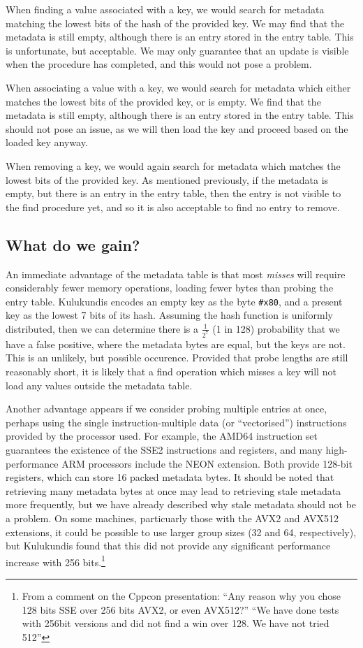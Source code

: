 \documentclass{article}
\begin{document}
When finding a value associated with a key, we would search for metadata
matching the lowest bits of the hash of the provided key. We may find
that the metadata is still empty, although there is an entry stored in
the entry table. This is unfortunate, but acceptable. We may only
guarantee that an update is visible when the procedure has completed,
and this would not pose a problem.

When associating a value with a key, we would search for metadata which
either matches the lowest bits of the provided key, or is empty. We find
that the metadata is still empty, although there is an entry stored in
the entry table. This should not pose an issue, as we will then load the
key and proceed based on the loaded key anyway.

When removing a key, we would again search for metadata which matches
the lowest bits of the provided key. As mentioned previously, if the
metadata is empty, but there is an entry in the entry table, then the
entry is not visible to the find procedure yet, and so it is also
acceptable to find no entry to remove.

\subsection{What do we gain?}

An immediate advantage of the metadata table is that most \emph{misses}
will require considerably fewer memory operations, loading fewer bytes
than probing the entry table. Kulukundis encodes an empty key as the
byte \texttt{\#x80}, and a present key as the lowest 7 bits of its
hash.  Assuming the hash function is uniformly distributed, then we
can determine there is a $ \frac{1}{2^7} $ (1 in 128) probability that
we have a false positive, where the metadata bytes are equal, but the
keys are not. This is an unlikely, but possible occurence. Provided
that probe lengths are still reasonably short, it is likely that a
find operation which misses a key will not load any values outside
the metadata table.

Another advantage appears if we consider probing multiple entries at
once, perhaps using the single instruction-multiple data (or
``vectorised'') instructions provided by the processor used. For
example, the AMD64 instruction set guarantees the existence of the
SSE2 instructions and registers, and many high-performance ARM
processors include the NEON extension. Both provide 128-bit registers,
which can store 16 packed metadata bytes. It should be noted that
retrieving many metadata bytes at once may lead to retrieving stale
metadata more frequently, but we have already described why stale
metadata should not be a problem. On some machines, particuarly those
with the AVX2 and AVX512 extensions, it could be possible to use
larger group sizes (32 and 64, respectively), but Kulukundis found
that this did not provide any significant performance increase with
256 bits.\footnote{From a comment on the Cppcon presentation: ``Any
  reason why you chose 128 bits SSE over 256 bits AVX2, or even
  AVX512?'' ``We have done tests with 256bit versions and did not find
  a win over 128.  We have not tried 512''}
\end{document}

